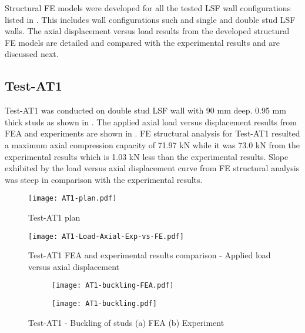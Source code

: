 Structural FE models were developed for all the tested LSF wall configurations listed in . This includes wall configurations such and single and double stud LSF walls. The axial displacement versus load results from the developed structural FE models are detailed and compared with the experimental results and are discussed next.  

\subsection*{Test-AT1}

Test-AT1 was conducted on double stud LSF wall with 90 mm deep. 0.95 mm thick studs as shown in . The applied axial load versus displacement results from FEA and experiments are shown in . FE structural analysis for Test-AT1 resulted a maximum axial compression capacity of 71.97 kN while it was 73.0 kN from the experimental results which is 1.03 kN less than the experimental results. Slope exhibited by the load versus axial displacement curve from FE structural analysis was steep in comparison with the experimental results.     
\begin{figure}[!htbp]
	\centering
			\texttt{[image: AT1-plan.pdf]}\\
		\caption{Test-AT1 plan}
		\label{fig:AT1-plan-fea}
\end{figure}
\begin{figure}[!htbp]
	\centering
			\texttt{[image: AT1-Load-Axial-Exp-vs-FE.pdf]}\\
		\caption{Test-AT1 FEA and experimental results comparison - Applied load versus axial displacement}
		\label{fig:AT1-fea-results}
\end{figure}
\begin{figure}[!htbp]
	\centering
	\begin{subfigure}[b]{0.4\textwidth}
		\centering
		\texttt{[image: AT1-buckling-FEA.pdf]}
		\caption{}
		\label{subfig:AT1-buckling-FEA}
	\end{subfigure}
	\begin{subfigure}[b]{0.4\textwidth}
		\centering
		\texttt{[image: AT1-buckling.pdf]}
		\caption{}
		\label{subfig:AT1-buckling-experiment}
	\end{subfigure}
	   \caption{Test-AT1 - Buckling of studs (a) FEA (b) Experiment}
	   \label{fig:AT1-buckling-fea-comparison}
\end{figure} 

